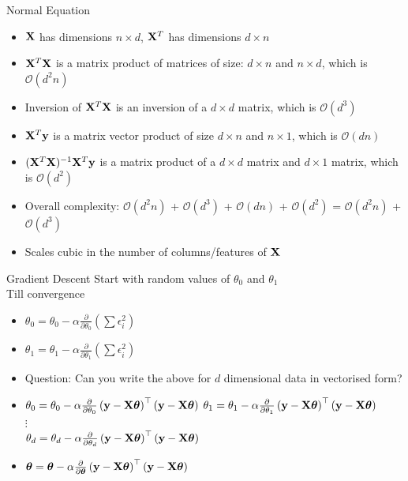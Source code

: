 \documentclass[usenames,dvipsnames]{beamer}
\begin{document}
\begin{frame}{Normal Equation}

\begin{itemize}[<+->]
	\item $\mathbf{X}$ has dimensions $n \times d$, $\mathbf{X}^T$ has dimensions $d \times n$
	\item $\mathbf{X}^T\mathbf{X}$ is a matrix product of matrices of size: $d \times n$ and $n \times d$, which is $\mathcal{O}(d^{2}n)$
	\item Inversion of $\mathbf{X}^T\mathbf{X}$ is an inversion of a $d \times d$ matrix, which is $\mathcal{O}(d^{3})$
	\item $\mathbf{X}^T\mathbf{y}$ is a matrix vector product of size $d \times n$ and $n \times 1$, which is $\mathcal{O}(dn)$
	\item $(\mathbf{X}^T\mathbf{X})^{-1}\mathbf{X}^T\mathbf{y}$ is a matrix product of a $d \times d$ matrix and $d \times 1$ matrix, which is $\mathcal{O}(d^2)$
	\item Overall complexity: $\mathcal{O}(d^{2}n)$ + $\mathcal{O}(d^{3})$ + $\mathcal{O}(dn)$ + $\mathcal{O}(d^2)$ = $\mathcal{O}(d^{2}n)$ + $\mathcal{O}(d^{3})$
	\item Scales cubic in the number of columns/features of $\mathbf{X}$
\end{itemize}



\end{frame}


\begin{frame}{Gradient Descent}
Start with random values of $\theta_{0}$ and $\theta_{1}$\\
Till convergence
\begin{itemize}[<+->]
	\item $\theta_{0} = \theta_{0} - \alpha\frac{\partial}{\partial \theta_{0}} (\sum \epsilon_{i}^{2}) $
	\item $\theta_{1} = \theta_{1} - \alpha \frac{\partial}{\partial \theta_{1}} (\sum \epsilon_{i}^{2}) $
	\item Question: Can you write the above for $d$ dimensional data in vectorised form?
	\item	\(\theta_{0}=\theta_{0}-\alpha \frac{\partial}{\partial \theta_{0}}\left(\mathbf{y}-\mathbf{X}\boldsymbol{\theta}\right)^{\top}\left(\mathbf{y}-\mathbf{X}\boldsymbol{\theta}\right)\)
	\(\theta_{1}=\theta_{1}-\alpha \frac{\partial}{\partial \theta_{1}}\left(\mathbf{y}-\mathbf{X}\boldsymbol{\theta}\right)^{\top}\left(\mathbf{y}-\mathbf{X}\boldsymbol{\theta}\right)\) 
	\\ $\vdots$
	\\	\(\theta_{d}=\theta_{d}-\alpha \frac{\partial}{\partial \theta_{d}}\left(\mathbf{y}-\mathbf{X}\boldsymbol{\theta}\right)^{\top}\left(\mathbf{y}-\mathbf{X}\boldsymbol{\theta}\right)\)
	\item \(\boldsymbol{\theta}=\boldsymbol{\theta} - \alpha \frac{\partial}{\partial \boldsymbol{\theta}}\left(\mathbf{y}-\mathbf{X}\boldsymbol{\theta}\right)^{\top}\left(\mathbf{y}-\mathbf{X}\boldsymbol{\theta}\right)\) 

\end{itemize}
\end{frame}
\end{document}

